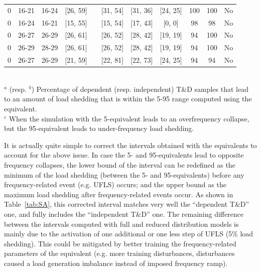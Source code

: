 {\begin{landscape}
\begin{table}
{\begin{tabular}{@{}ccccccccccc@{}}
0   & 16-21 & 16-24 & [26, 59] & & [31, 54] & [31, 36] & [24, 25]  & 100 & 100 & No  \\
0   & 16-24 & 16-21 & [15, 55] & & [15, 54] & [17, 43] & [0, 0]  & 98  & 98  & No  \\
0   & 26-27 & 26-29 & [26, 61] & & [26, 52] & [28, 42] & [19, 19]  & 94  & 100 & No  \\
0   & 26-29 & 28-29 & [26, 61] & & [26, 52] & [28, 42] & [19, 19]  & 94  & 100 & No  \\
0   & 26-27 & 26-29 & [21, 59] & & [22, 81] & [22, 73] & [24, 25]  & 94  & 94  & No  \\ \bottomrule
\end{tabular}
} \\ \vspace{0.1cm}
\footnotesize{\(^a\) (resp. \(^b\)) Percentage of dependent (resp. independent) T\&D samples that lead to an amount of load shedding that is within the 5-95 range computed using the equivalent. \\$^c$ When the simulation with the 5-equivalent leads to an overfrequency collapse, but the 95-equivalent leads to under-frequency load shedding.}
\end{table}
\end{landscape}
\clearpage%
}

It is actually quite simple to correct the intervals obtained with the equivalents to account for the above issue. In case the 5- and 95-equivalents lead to opposite frequency collapses, the lower bound of the interval can be redefined as the minimum of the load shedding (between the 5- and 95-equivalents) before any frequency-related event (e.g. UFLS) occurs; and the upper bound as the maximum load shedding after frequency-related events occur. As shown in Table~\ref{tab:SA}, this corrected interval matches very well the ``dependent T\&D'' one, and fully includes the ``independent T\&D'' one. The remaining difference between the intervals computed with full and reduced distribution models is mainly due to the activation of one additional or one less step of UFLS (5\% load shedding). This could be mitigated by better training the frequency-related parameters of the equivalent (e.g. more training disturbances, disturbances caused a load generation imbalance instead of imposed frequency ramp).

